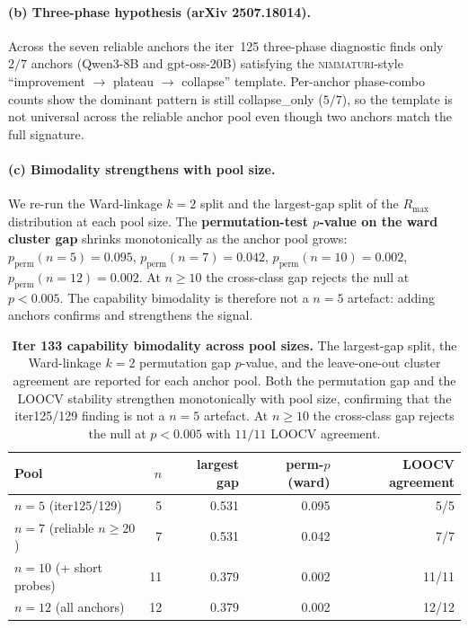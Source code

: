 \paragraph{(b) Three-phase hypothesis (arXiv 2507.18014).}
\label{par:scaling-iter133-tp}
Across the seven reliable anchors the iter~125 three-phase
diagnostic finds only $2/7$ anchors (Qwen3-8B and gpt-oss-20B)
satisfying the \textsc{nimmaturi}-style ``improvement $\to$ plateau
$\to$ collapse'' template.  Per-anchor phase-combo counts show the
dominant pattern is still collapse_only ($5/7$), so the template is
not universal across the reliable anchor pool even though two anchors
match the full signature.

\paragraph{(c) Bimodality strengthens with pool size.}
\label{par:scaling-iter133-bimod}
We re-run the Ward-linkage $k=2$ split and the largest-gap split
of the $R_{\max}$ distribution at each pool size.  The
\textbf{permutation-test $p$-value on the ward cluster gap}
shrinks monotonically as the anchor pool grows:
$p_{\text{perm}}(n=5) = 0.095$,
$p_{\text{perm}}(n=7) = 0.042$,
$p_{\text{perm}}(n=10) = 0.002$,
$p_{\text{perm}}(n=12) = 0.002$.
At $n \ge 10$ the cross-class gap rejects the null at
$p < 0.005$.  The capability bimodality is therefore not a
$n = 5$ artefact: adding anchors confirms and strengthens the
signal.

\begin{table}[t]
  \centering
  \small
  \begin{tabular}{lrrrr}
    \toprule
    Pool & $n$ & largest gap & perm-$p$(ward) & LOOCV agreement \\
    \midrule
    $n=5$ (iter125/129)        &  5 & 0.531 & 0.095 & 5/5   \\
    $n=7$ (reliable $n \ge 20$)&  7 & 0.531 & 0.042 & 7/7   \\
    $n=10$ (+ short probes)    & 11 & 0.379 & 0.002 & 11/11 \\
    $n=12$ (all anchors)       & 12 & 0.379 & 0.002 & 12/12 \\
    \bottomrule
  \end{tabular}
  \caption{\textbf{Iter 133 capability bimodality across pool sizes.}
    The largest-gap split, the Ward-linkage $k=2$ permutation gap
    $p$-value, and the leave-one-out cluster agreement are reported
    for each anchor pool.  Both the permutation gap and the LOOCV
    stability strengthen monotonically with pool size, confirming
    that the iter125/129 finding is not a $n = 5$ artefact.  At
    $n \ge 10$ the cross-class gap rejects the null at $p < 0.005$
    with $11/11$ LOOCV agreement.}
  \label{tab:scaling-iter133-bimod}
\end{table}


